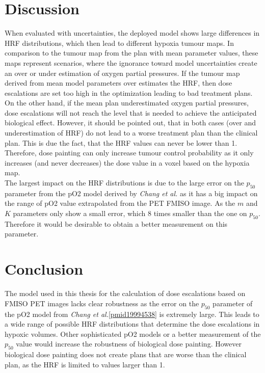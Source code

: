 \section{Discussion}
When evaluated with uncertainties, the deployed model shows large differences in HRF distributions, which then lead to different hypoxia tumour maps. In comparison to the tumour map from the plan with mean parameter values, these maps represent scenarios, where the ignorance toward model uncertainties create an over or under estimation of oxygen partial pressures. If the tumour map derived from mean model parameters over estimates the HRF, then dose escalations are set too high in the optimization leading to bad treatment plans. On the other hand, if the mean plan underestimated oxygen partial pressures, dose escalations will not reach the level that is needed to achieve the anticipated biological effect. However, it should be pointed out, that in both cases (over and underestimation of HRF) do not lead to a worse treatment plan than the clinical plan. This is due the fact, that the HRF values can never be lower than 1. Therefore, dose painting can only increase tumour control probability as it only increases (and never decreases) the dose value in a voxel based on the hypoxia map.\\The largest impact on the HRF distributions is due to the large error on the $p_{50}$ parameter from the pO2 model derived by \textit{Chang et al.} as it has a big impact on the range of pO2 value extrapolated from the PET FMISO image. As the $m$ and $K$ parameters only show a small error, which 8 times smaller than the one on $p_{50}$. Therefore it would be desirable to obtain a better measurement on this parameter. 
\section{Conclusion}
The model used in this thesis for the calculation of dose escalations based on FMISO PET images lacks clear robustness as the error on the $p_{50}$ parameter of the pO2 model from \textit{Chang et al.}\ref{pmid19994538} is extremely large. This leads to a wide range of possible HRF distributions that determine the dose escalations in hypoxic volumes. Other sophisticated pO2 models or a better measurement of the $p_{50}$ value would increase the robustness of biological dose painting. However biological dose painting does not create plans that are worse than the clinical plan, as the HRF is limited to values larger than 1.